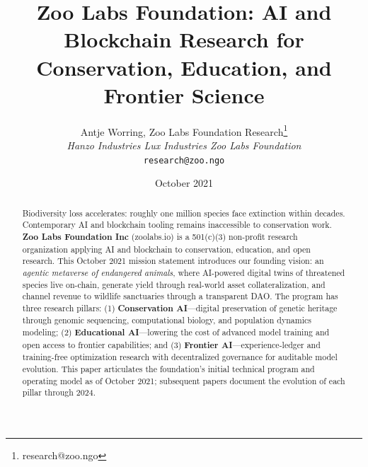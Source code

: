 \documentclass[twocolumn,11pt]{article}
\title{\textbf{Zoo Labs Foundation: AI and Blockchain Research for Conservation, Education, and Frontier Science}}
\author{
Antje Worring, Zoo Labs Foundation Research\thanks{research@zoo.ngo}\\
\textit{Hanzo Industries \quad Lux Industries \quad Zoo Labs Foundation}\\
\texttt{research@zoo.ngo}
}
\date{October 2021}
\begin{document}
\zoocoverpage

\begin{abstract}
\noindent Biodiversity loss accelerates: roughly one million species face extinction within decades. Contemporary AI and blockchain tooling remains inaccessible to conservation work. \textbf{Zoo Labs Foundation Inc} (zoolabs.io) is a 501(c)(3) non-profit research organization applying AI and blockchain to conservation, education, and open research. This October 2021 mission statement introduces our founding vision: an \emph{agentic metaverse of endangered animals}, where AI-powered digital twins of threatened species live on-chain, generate yield through real-world asset collateralization, and channel revenue to wildlife sanctuaries through a transparent DAO. The program has three research pillars: (1) \textbf{Conservation AI}---digital preservation of genetic heritage through genomic sequencing, computational biology, and population dynamics modeling; (2) \textbf{Educational AI}---lowering the cost of advanced model training and open access to frontier capabilities; and (3) \textbf{Frontier AI}---experience-ledger and training-free optimization research with decentralized governance for auditable model evolution. This paper articulates the foundation's initial technical program and operating model as of October 2021; subsequent papers document the evolution of each pillar through 2024.
\end{abstract}













\end{document}
